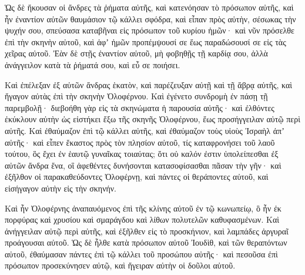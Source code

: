 {\par }{\PP {}Ὡς δὲ ἤκουσαν οἱ ἄνδρες τὰ ῥήματα αὐτῆς, καὶ κατενόησαν τὸ πρόσωπον αὐτῆς, καὶ ἦν ἐναντίον αὐτῶν θαυμάσιον τῷ κάλλει σφόδρα, καὶ εἶπαν πρὸς αὐτὴν,
σέσωκας τὴν ψυχήν σου, σπεύσασα καταβῆναι εἰς πρόσωπον τοῦ κυρίου ἡμῶν· καὶ νῦν πρόσελθε ἐπὶ τὴν σκηνὴν αὐτοῦ, καὶ ἀφʼ ἡμῶν προπέμψουσί σε ἕως παραδώσουσί σε εἰς τὰς χεῖρας αὐτοῦ.
Ἐὰν δὲ στῇς ἐναντίον αὐτοῦ, μὴ φοβηθῇς τῇ καρδίᾳ σου, ἀλλὰ ἀνάγγειλον κατὰ τὰ ῥήματά σου, καὶ εὖ σε ποιήσει.
\par }{\PP {}Καὶ ἐπέλεξαν ἐξ αὐτῶν ἄνδρας ἑκατὸν, καὶ παρέζευξαν αὐτῇ καὶ τῇ ἅβρᾳ αὐτῆς, καὶ ἤγαγον αὐτὰς ἐπὶ τὴν σκηνὴν Ὀλοφέρνου.
Καὶ ἐγένετο συνδρομὴ ἐν πάσῃ τῇ παρεμβολῇ· διεβοήθη γὰρ εἰς τὰ σκηνώματα ἡ παρουσία αὐτῆς· καὶ ἐλθόντες ἐκύκλουν αὐτὴν ὡς εἱστήκει ἔξω τῆς σκηνῆς Ὀλοφέρνου, ἕως προσήγγειλαν αὐτῷ περὶ αὐτῆς.
Καὶ ἐθαύμαζον ἐπὶ τῷ κάλλει αὐτῆς, καὶ ἐθαύμαζον τοὺς υἱοὺς Ἰσραὴλ ἀπʼ αὐτῆς· καὶ εἶπεν ἕκαστος πρὸς τὸν πλησίον αὐτοῦ, τίς καταφρονήσει τοῦ λαοῦ τούτου, ὃς ἔχει ἐν ἑαυτῷ γυναῖκας τοιαύτας; ὅτι οὐ καλόν ἐστιν ὑπολείπεσθαι ἐξ αὐτῶν ἄνδρα ἕνα, οἳ ἀφεθέντες δυνήσονται κατασοφίσασθαι πᾶσαν τὴν γῆν·
καὶ ἐξῆλθον οἱ παρακαθεύδοντες Ὀλοφέρνῃ, καὶ πάντες οἱ θεράποντες αὐτοῦ, καὶ εἰσήγαγον αὐτὴν εἰς τὴν σκηνήν.
\par }{\PP {}Καὶ ἦν Ὀλοφέρνης ἀναπαυόμενος ἐπὶ τῆς κλίνης αὐτοῦ ἐν τῷ κωνωπείῳ, ὃ ἦν ἐκ πορφύρας καὶ χρυσίου καὶ σμαράγδου καὶ λίθων πολυτελῶν καθυφασμένων.
Καὶ ἀνήγγειλαν αὐτῷ περὶ αὐτῆς, καὶ ἐξῆλθεν εἰς τὸ προσκήνιον, καὶ λαμπάδες ἀργυραῖ προάγουσαι αὐτοῦ.
Ὡς δὲ ἦλθε κατὰ πρόσωπον αὐτοῦ Ἰουδὶθ, καὶ τῶν θεραπόντων αὐτοῦ, ἐθαύμασαν πάντες ἐπὶ τῷ κάλλει τοῦ προσώπου αὐτῆς· καὶ πεσοῦσα ἐπὶ πρόσωπον προσεκύνησεν αὐτῷ, καὶ ἤγειραν αὐτὴν οἱ δοῦλοι αὐτοῦ.

}
